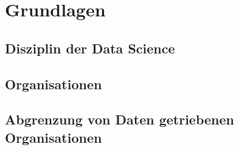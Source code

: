 \chapter[Grundlagen]{Grundlagen}

\section{Disziplin der Data Science}

\section{Organisationen}

\section{Abgrenzung von Daten getriebenen Organisationen}